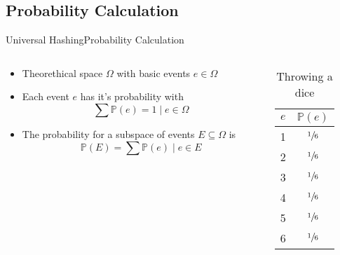 \subsection{Probability Calculation}

\begin{frame}{Universal Hashing}{Probability Calculation}
  \begin{columns}
    \begin{column}{0.65\textwidth}
      \begin{itemize}
        \item
          Theorethical space $\Omega$ with basic events $e \in \Omega$
        \item
          Each event $e$ has it's probability with
          \[\sum \mathbb{P}(e) = 1 \mid e \in \Omega\]
        \item
          The probability for a subspace of events $E \subseteq \Omega$ 
          is
        \[\mathbb{P}(E) = \sum \mathbb{P}(e) \mid e \in E\]
      \end{itemize}
    \end{column}
    \begin{column}{0.35\textwidth}
      \begin{table}[!h]
        \caption{Throwing a dice}
        \label{tab:probabilities_rolling_dice}
        \begin{tabularx}{0.5\linewidth}{c|c}
          $e$ & $\mathbb{P}(e)$\\
          \midrule
          1 & $\sfrac{1}{6}$\\
          2 & $\sfrac{1}{6}$\\
          3 & $\sfrac{1}{6}$\\
          4 & $\sfrac{1}{6}$\\
          5 & $\sfrac{1}{6}$\\
          6 & $\sfrac{1}{6}$\\
        \end{tabularx}
      \end{table}
    \end{column}
  \end{columns}
\end{frame}


